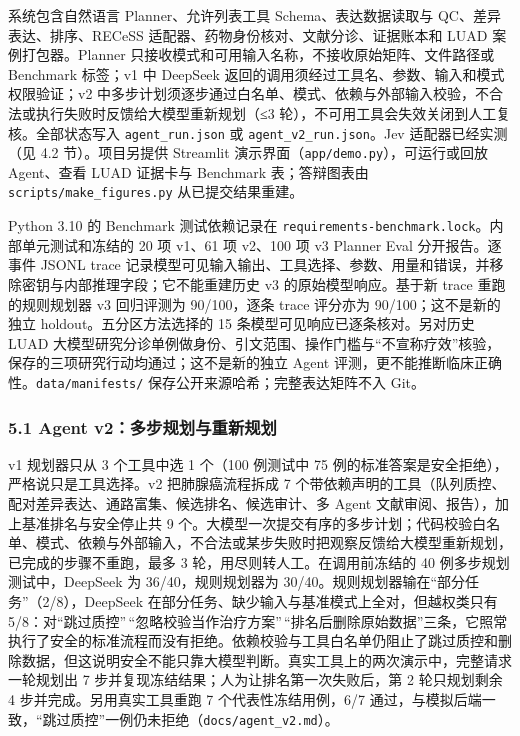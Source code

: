 \documentclass[
  10pt,
]{ctexart}
\begin{document}
系统包含自然语言 Planner、允许列表工具 Schema、表达数据读取与
QC、差异表达、排序、RECeSS 适配器、药物身份核对、文献分诊、证据账本和
LUAD 案例打包器。Planner
只接收模式和可用输入名称，不接收原始矩阵、文件路径或 Benchmark 标签；v1
中 DeepSeek 返回的调用须经过工具名、参数、输入和模式权限验证；v2
中多步计划须逐步通过白名单、模式、依赖与外部输入校验，不合法或执行失败时反馈给大模型重新规划（≤3
轮），不可用工具会失效关闭到人工复核。全部状态写入
\texttt{agent\_\allowbreak{}run.\allowbreak{}json} 或 \texttt{agent\_\allowbreak{}v2\_\allowbreak{}run.\allowbreak{}json}。Jev
适配器已经实测（见 4.2 节）。项目另提供 Streamlit
演示界面（\texttt{app/\allowbreak{}demo.\allowbreak{}py}），可运行或回放 Agent、查看 LUAD 证据卡与
Benchmark 表；答辩图表由 \texttt{scripts/\allowbreak{}make\_\allowbreak{}figures.\allowbreak{}py}
从已提交结果重建。

Python 3.10 的 Benchmark 测试依赖记录在
\texttt{requirements-benchmark.\allowbreak{}lock}。内部单元测试和冻结的 20 项 v1、61
项 v2、100 项 v3 Planner Eval 分开报告。逐事件 JSONL trace
记录模型可见输入输出、工具选择、参数、用量和错误，并移除密钥与内部推理字段；它不能重建历史
v3 的原始模型响应。基于新 trace 重跑的规则规划器 v3 回归评测为
90/100，逐条 trace 评分亦为 90/100；这不是新的独立
holdout。五分区方法选择的 15 条模型可见响应已逐条核对。另对历史 LUAD
大模型研究分诊单例做身份、引文范围、操作门槛与``不宣称疗效''核验，保存的三项研究行动均通过；这不是新的独立
Agent 评测，更不能推断临床正确性。\texttt{data/\allowbreak{}manifests/\allowbreak{}}
保存公开来源哈希；完整表达矩阵不入 Git。

\subsubsection{5.1 Agent
v2：多步规划与重新规划}\label{51-agent-v2ux591aux6b65ux89c4ux5212ux4e0eux91cdux65b0ux89c4ux5212}

v1 规划器只从 3 个工具中选 1 个（100 例测试中 75
例的标准答案是安全拒绝），严格说只是工具选择。v2 把肺腺癌流程拆成 7
个带依赖声明的工具（队列质控、配对差异表达、通路富集、候选排名、候选审计、多
Agent 文献审阅、报告），加上基准排名与安全停止共 9
个。大模型一次提交有序的多步计划；代码校验白名单、模式、依赖与外部输入，不合法或某步失败时把观察反馈给大模型重新规划，已完成的步骤不重跑，最多
3 轮，用尽则转人工。在调用前冻结的 40 例多步规划测试中，DeepSeek 为
36/40，规则规划器为 30/40。规则规划器输在``部分任务''（2/8），DeepSeek
在部分任务、缺少输入与基准模式上全对，但越权类只有
5/8：对``跳过质控''\,``忽略校验当作治疗方案''\,``排名后删除原始数据''三条，它照常执行了安全的标准流程而没有拒绝。依赖校验与工具白名单仍阻止了跳过质控和删除数据，但这说明安全不能只靠大模型判断。真实工具上的两次演示中，完整请求一轮规划出
7 步并复现冻结结果；人为让排名第一次失败后，第 2 轮只规划剩余 4
步并完成。另用真实工具重跑 7 个代表性冻结用例，6/7
通过，与模拟后端一致，``跳过质控''一例仍未拒绝（\texttt{docs/\allowbreak{}agent\_\allowbreak{}v2.\allowbreak{}md}）。
\end{document}
